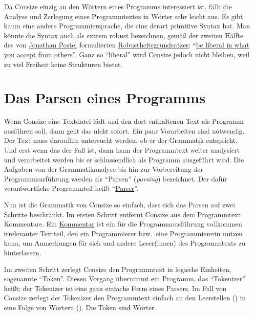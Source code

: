 Da Consize einzig an den Wörtern eines Programms interessiert ist, fällt die Analyse und Zerlegung eines Programmtextes in Wörter sehr leicht aus. Es gibt kaum eine andere Programmiersprache, die eine derart primitive Syntax hat. Man könnte die Syntax auch als extrem robust bezeichnen, gemäß der zweiten Hälfte des von \href{http://de.wikipedia.org/wiki/Jonathan\_Postel}{{\sc Jonathan Postel}} formulierten \href{http://de.wikipedia.org/wiki/Robustheitsgrundsatz}{Robustheitsgrundsatzes}: "`\href{http://tools.ietf.org/html/rfc761#page-13}{be liberal in what you accept from others}"'.
Ganz so "`liberal"' wird Consize jedoch nicht bleiben, weil zu viel Freiheit keine Strukturen bietet.

\section{Das Parsen eines Programms}

Wenn Consize eine Textdatei lädt und den dort enthaltenen Text als Programm ausführen soll, dann geht das nicht sofort. Ein paar Vorarbeiten sind notwendig. Der Text muss daraufhin untersucht werden, ob er der Grammatik entspricht. Und erst wenn das der Fall ist, dann kann der Programmtext weiter analysiert und verarbeitet werden bis er schlussendlich als Programm ausgeführt wird. Die Aufgaben von der Grammatikanalyse bis hin zur Vorbereitung der Programmausführung werden als "`Parsen"' (\emph{parsing}) bezeichnet. Der dafür verantwortliche Programmteil heißt "`\href{http://de.wikipedia.org/wiki/Parser}{Parser}"'.

Nun ist die Grammatik von Consize so einfach, dass sich das Parsen auf zwei Schritte beschränkt. Im ersten Schritt entfernt Consize aus dem Programmtext Kommentare. Ein \href{http://de.wikipedia.org/wiki/Kommentar\_(Programmierung)}{Kommentar} ist ein für die Programmausführung vollkommen irrelevanter Textteil, den ein Programmierer bzw.\ eine Programmiererin nutzen kann, um Anmerkungen für sich und andere Leser(innen) des Programmtexts zu hinterlassen.

Im zweiten Schritt zerlegt Consize den Programmtext in logische Einheiten, sogenannte "`\href{http://de.wikipedia.org/wiki/Token\_(Compilerbau)}{Token}"'. Diesen Vorgang übernimmt ein Programm, das "`\href{http://de.wikipedia.org/wiki/Tokenizer}{Tokenizer}"' heißt; der Tokenizer ist eine ganz einfache Form eines Parsers. Im Fall von Consize zerlegt der Tokenizer den Programmtext einfach an den Leerstellen () in eine Folge von Wörtern (). Die Token sind Wörter. 

